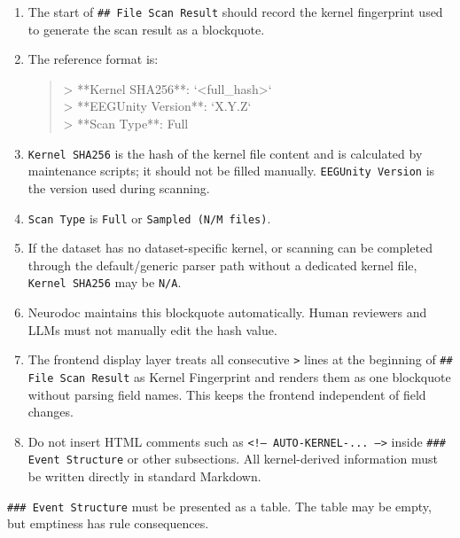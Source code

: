 \begin{tcolorbox}
\begin{enumerate}[leftmargin=1.5em,noitemsep,topsep=2pt]
\item The start of \texttt{\#\# File Scan Result} should record the kernel fingerprint used to generate the scan result as a blockquote.
\item The reference format is:
\begin{quote}\ttfamily\footnotesize
> **Kernel SHA256**: `<full\_hash>`\\
> **EEGUnity Version**: `X.Y.Z`\\
> **Scan Type**: Full\\
\end{quote}
\item \texttt{Kernel SHA256} is the hash of the kernel file content and is calculated by maintenance scripts; it should not be filled manually. \texttt{EEGUnity Version} is the version used during scanning.
\item \texttt{Scan Type} is \texttt{Full} or \texttt{Sampled (N/M files)}.
\item If the dataset has no dataset-specific kernel, or scanning can be completed through the default/generic parser path without a dedicated kernel file, \texttt{Kernel SHA256} may be \texttt{N/A}.
\item Neurodoc maintains this blockquote automatically. Human reviewers and LLMs must not manually edit the hash value.
\item The frontend display layer treats all consecutive \texttt{>} lines at the beginning of \texttt{\#\# File Scan Result} as Kernel Fingerprint and renders them as one blockquote without parsing field names. This keeps the frontend independent of field changes.
\item Do not insert HTML comments such as \texttt{<!-- AUTO-KERNEL-... -->} inside \texttt{\#\#\# Event Structure} or other subsections. All kernel-derived information must be written directly in standard Markdown.
\end{enumerate}

\smallskip{}\par\smallskip

\noindent \texttt{\#\#\# Event Structure} must be presented as a table. The table may be empty, but emptiness has rule consequences.\par\smallskip

\smallskip{}\par\smallskip


\end{tcolorbox}
